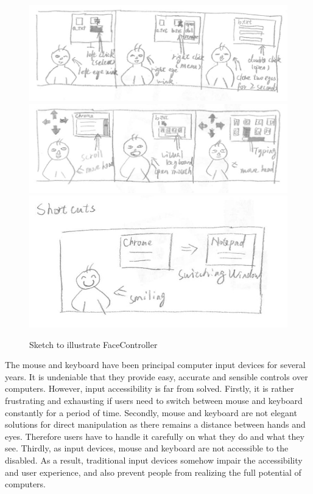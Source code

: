 \documentclass{sigchi}
\begin{document}
\begin{figure}[h]
    \centering
    \includegraphics[width=0.9\columnwidth]{figures/sketch1}
    \includegraphics[width=0.9\columnwidth]{figures/sketch2}
    \includegraphics[width=0.9\columnwidth]{figures/sketch3}
    \caption{Sketch to illustrate FaceController}
    \label{fig:sketch}
\end{figure}

The mouse and keyboard have been principal computer input devices for several years.
It is undeniable that they provide easy, accurate and sensible controls over computers.
However, input accessibility is far from solved.
Firstly, it is rather frustrating and exhausting if users need to switch between mouse and keyboard constantly for a period of time. 
Secondly, mouse and keyboard are not elegant solutions for direct manipulation as there remains a distance between hands and eyes.
Therefore users have to handle it carefully on what they do and what they see.
Thirdly, as input devices, mouse and keyboard are not accessible to the disabled.
As a result, traditional input devices somehow impair the accessibility and user experience, and also prevent people from realizing the full potential of computers.
\end{document}
